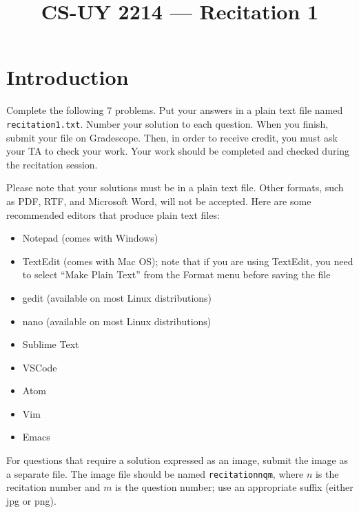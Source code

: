 \documentclass{article}
\title{CS-UY 2214 — Recitation 1}
\begin{document}
\maketitle

\section*{Introduction}
Complete the following 7 problems. Put your answers in a plain text file named \texttt{recitation1.txt}. Number your solution to each question. When you finish, submit your file on Gradescope. Then, in order to receive credit, you must ask your TA to check your work. Your work should be completed and checked during the recitation session.

Please note that your solutions must be in a plain text file. Other formats, such as PDF, RTF, and Microsoft Word, will not be accepted. Here are some recommended editors that produce plain text files:
\begin{itemize}
    \item Notepad (comes with Windows)
    \item TextEdit (comes with Mac OS); note that if you are using TextEdit, you need to select “Make Plain Text” from the Format menu before saving the file
    \item gedit (available on most Linux distributions)
    \item nano (available on most Linux distributions)
    \item Sublime Text
    \item VSCode
    \item Atom
    \item Vim
    \item Emacs
\end{itemize}

For questions that require a solution expressed as an image, submit the image as a separate file. The image file should be named \texttt{recitationnqm}, where $n$ is the recitation number and $m$ is the question number; use an appropriate suffix (either jpg or png).
\end{document}
